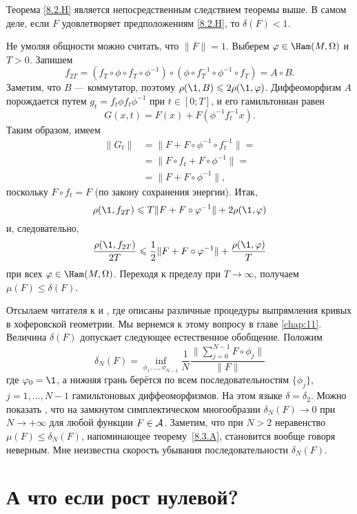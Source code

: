 Теорема \ref{8.2.H} является непосредственным следствием теоремы выше. 
В самом деле, если $F$ удовлетворяет предположениям \ref{8.2.H}, то
$\delta (F) <1$. 

Не умоляя общности можно считать, что $\|F \| = 1$.
Выберем $\phi \in \Ham (M, \Omega)$ и $T> 0$.
Запишем 
\[f_{2T}= (f_T \circ \phi \circ f_T \circ \phi^{-1}) \circ (\phi \circ
f_T^{-1} \circ \phi^{-1} \circ f_T) = A \circ B.\] 
Заметим, что $B$ — коммутатор, поэтому $\rho (\1, B) \le 2\rho (\1, \phi)$.
Диффеоморфизм $A$ порождается путем $g_t = f_t \phi f_t \phi ^{-1}$
при $t \in [0;T]$, и его гамильтониан равен  
\[G (x, t) = F (x) + F (\phi^{-1} f_t^{-1} x).\]
Таким образом, имеем 
\begin{align*}
\|G_t \| &= \|F + F \circ \phi ^{-1} \circ f_t ^{-1} \| =
\\
&=\|F \circ f_t + F \circ \phi ^{-1} \| =
\\
&=\|F + F \circ \phi ^{-1} \|,\end{align*}
поскольку $F \circ f_t = F$ (по закону сохранения энергии).
Итак, 
\[\rho (\1, f_{2T}) \le T \| F + F \circ \phi ^{-1} \| + 2\rho (\1, \phi)\]
и, следовательно, 
\[\frac{\rho (\1, f_{2T})}{2T}
\le\frac12 \|F + F \circ \phi ^{-1} \| + \frac{\rho (\1, \phi)}{T}\]
при всех $\phi \in \Ham (M , \Omega)$.
Переходя к пределу при $T \to \infty$, получаем $\mu (F) \le \delta (F)$.
\qeds

Отсылаем читателя к \cite{LM2} и \cite{P9}, где описаны различные
процедуры выпрямления кривых в хоферовской геометрии. 
Мы вернемся к этому вопросу в главе \ref{chap:11}.
Величина $\delta (F)$ допускает следующее естественное обобщение.
Положим 
\[
\delta_N(F)
=
\inf_{\phi_1 ,\dots, \phi_{N-1}}
\frac1N
\frac{\|\sum_{j=0}^{N-1} F \circ \phi_j\|}{\|F\|}
\] 
где $\phi_0 = \1$, а нижняя грань берётся по всем последовательностям $\{\phi_j\}$, $j = 1,\dots, N-1 $ гамильтоновых диффеоморфизмов. 
На этом языке $\delta = \delta_2$. 
Можно показать \cite{P9}, что на замкнутом симплектическом многообразии $\delta_N (F) \to 0$ при $N \to + \infty$ для любой функции $F \in \mathcal{A}$.
Заметим, что при $N>2$ неравенство $\mu(F)\le\delta_N(F)$, напоминающее теорему~\ref{8.3.A},
становится вообще говоря неверным.
Мне неизвестна скорость убывания последовательности $\delta_N (F)$. 

\section{А что если рост нулевой?}\label{sec:8.4}

